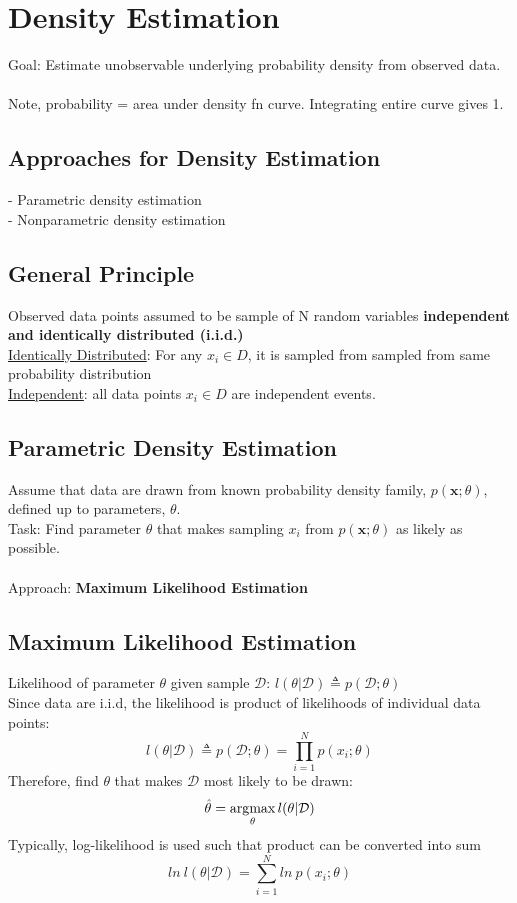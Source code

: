 \section{Density Estimation}
Goal: Estimate unobservable underlying probability density from observed data.\\\\
Note, probability = area under density fn curve. Integrating entire curve gives 1.\\
\subsection*{Approaches for Density Estimation}
- Parametric density estimation\\
- Nonparametric density estimation\\
\subsection*{General Principle}
Observed data points assumed to be sample of N random variables \textbf{independent 
and identically distributed (i.i.d.)}\\
\underline{Identically Distributed}: For any $x_i \in D$, it is sampled from 
sampled from same probability distribution\\
\underline{Independent}: all data points $x_i \in D$ are independent events.

\subsection*{Parametric Density Estimation}
Assume that data are drawn from known probability density family, $p(\mathbf{x}; \theta)$,
defined up to parameters, $\theta$.\\
Task: Find parameter $\theta$ that makes sampling $x_i$ from $p(\mathbf{x}; \theta)$
as likely as possible.\\\\
Approach: \textbf{Maximum Likelihood Estimation}
\subsection*{Maximum Likelihood Estimation}
Likelihood of parameter $\theta$ given sample $\mathcal{D}$: $l(\theta|\mathcal{D}) \triangleq p(\mathcal{D};\theta)$\\
Since data are i.i.d, the likelihood is product of likelihoods of individual data points:\\
\[l(\theta|\mathcal{D}) \triangleq p(\mathcal{D};\theta) = \prod^N_{i=1}p(x_i; \theta)\]
Therefore, find $\theta$ that makes $\mathcal{D}$ most likely to be drawn:
\[\hat{\theta} = \operatorname*{\arg\!\max}_\theta l(\theta|\mathcal{D})\]
Typically, log-likelihood is used such that product can be converted into sum\\
\[ln\ l(\theta|\mathcal{D}) = \sum^N_{i=1}ln\ p(x_i; \theta)\]
